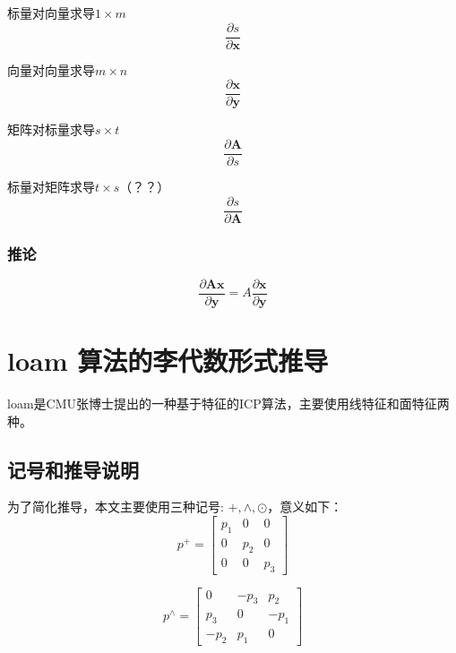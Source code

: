 \documentclass{ctexart}
\begin{document}
	\par 标量对向量求导$1\times m$
	\begin{equation}
	\frac{\partial s}{\partial\boldsymbol{x}}
	\end{equation}
	
	\par 向量对向量求导$m\times n$
	\begin{equation}
	\frac{\partial\boldsymbol{x}}{\partial\boldsymbol{y}}
	\end{equation}
	
	\par 矩阵对标量求导$s\times t$
	\begin{equation}
	\frac{\partial\boldsymbol{A}}{\partial s}
	\end{equation}
	
	\par 标量对矩阵求导$t\times s$（？？）
	\begin{equation}
	\frac{\partial s}{\partial\boldsymbol{A}}
	\end{equation}
	
	\subsubsection{推论}
	\begin{equation}
	\frac{\partial \boldsymbol{Ax}}{\partial \boldsymbol{y}}
	=
	A \frac{\partial \boldsymbol{x}}{\partial \boldsymbol{y}}
	\end{equation}
	
	
	
	\section{loam 算法的李代数形式推导}
	\newcommand{\vecba}[1]{\boldmath\overrightarrow{#1}\unboldmath}
	loam是CMU张博士提出的一种基于特征的ICP算法，主要使用线特征和面特征两种。
	\subsection{记号和推导说明}
	为了简化推导，本文主要使用三种记号: $+,\wedge,\odot$，意义如下：
	\begin{equation}
	p^+=\begin{bmatrix}
	p_1 & 0 & 0 \\
	0 & p_2 & 0 \\
	0 & 0 & p_3
	\end{bmatrix}
	\end{equation}

	\begin{equation}
	p^\wedge=\begin{bmatrix}
	0 & -p_3 & p_2 \\
	p_3 & 0 & -p_1 \\
	-p_2 & p_1 & 0
	\end{bmatrix}
	\end{equation}
\end{document}
